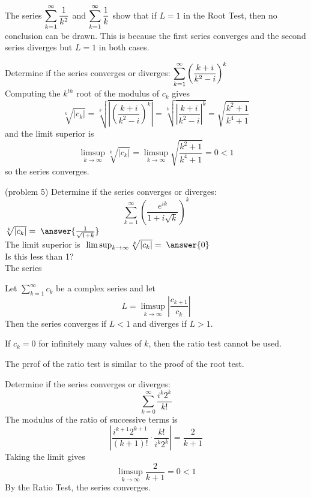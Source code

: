 \documentclass[handout]{ximera}
\begin{document}
\begin{remark}
The series $\displaystyle \sum_{k=1}^\infty \frac{1}{k^2}$ and $\displaystyle \sum_{k=1}^\infty \frac{1}{k}$ show that if $L = 1$ in the Root Test,
then no conclusion can be drawn. This is because the first series converges and the second series diverges but $L=1$ in both cases.
\end{remark}

\begin{example}[example 5]
Determine if the series converges or diverges: $\displaystyle \sum_{k=1}^\infty \left(\frac{k+i}{k^2 - i}\right)^k$\\
Computing the $k^{th}$ root of the modulus of $c_k$ gives
\[
\sqrt[k]{|c_k|} = \sqrt[k]{\left|\left(\frac{k+i}{k^2 - i}\right)^k\right|} = \sqrt[k]{\left|\frac{k+i}{k^2 - i}\right|^k} = \sqrt{\frac{k^2 + 1}{k^4 + 1}}
\]
and the limit superior is
\[
\limsup_{k \to \infty} \sqrt[k]{|c_k|} = \limsup_{k \to \infty}  \sqrt{\frac{k^2 + 1}{k^4 + 1}} = 0 <1
\]
so the series converges.
\end{example}


\begin{problem}(problem 5)
Determine if the series converges or diverges: 
\[
\sum_{k=1}^\infty \left(\frac{e^{ik}}{1+i\sqrt k}\right)^k
\]
$\sqrt[k]{|c_k|} = \; \answer{\frac{1}{\sqrt{1+k}}}$\\
The limit superior is $\; \limsup_{k\to\infty}\sqrt[k]{|c_k|}= \; \answer{0}$\\
Is this less than 1? \\
The series  
\end{problem}

\begin{theorem}
Let $\displaystyle \sum_{k=1}^\infty c_k$ be a complex series and let 
\[
L = \limsup_{k \to \infty} \left|\frac{c_{k+1}}{c_k}\right|
\]
Then the series converges if $L <1$ and diverges if $L >1$.
\end{theorem}

\begin{remark} 
If $c_k = 0$ for infinitely many values of $k$, then the ratio test cannot be used.
\end{remark}
\begin{remark} 
The prrof of the ratio test is similar to the proof of the root test.
\end{remark}

\begin{example}[example 6]
Determine if the series converges or diverges: 
\[
\sum_{k=0}^\infty \frac{i^k2^k}{k!}
\]
The modulus of the ratio of successive terms is
\[
\left|\frac{i^{k+1}2^{k+1}}{(k+1)!}\cdot \frac{k!}{i^k 2^k}\right| = \frac{2}{k+1}
\]
Taking the limit gives
\[
\limsup_{k \to \infty} \frac{2}{k+1} = 0 < 1
\]
By the Ratio Test, the series converges.
\end{example}
\end{document}
